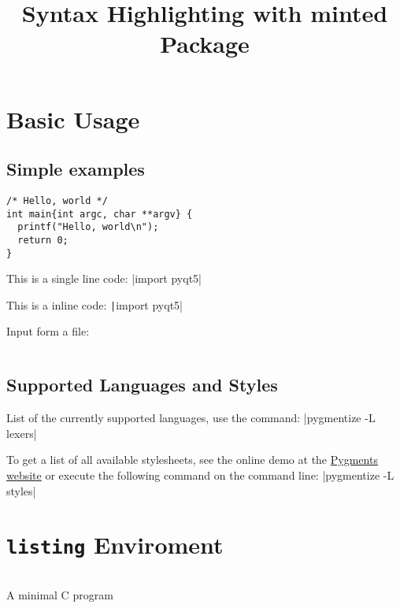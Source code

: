 \documentclass{article}
\begin{document}
\title{Syntax Highlighting with minted Package}

\maketitle

\tableofcontents

\listoflistings   %

\section{Basic Usage}

\subsection{Simple examples}

\begin{verbatim}
/* Hello, world */
int main{int argc, char **argv} {
  printf("Hello, world\n");
  return 0;
}
\end{verbatim}

This is a single line code: |import pyqt5|

This is a inline code: \texttt|import pyqt5|

Input form a file:

\inputminted[]{c}{../code/helloworld.c}

\subsection{Supported Languages and Styles}

List of the currently supported languages, use the command: |pygmentize -L lexers|

To get a list of all available stylesheets, see the online demo at the 
\href{https://pygments.org/demo/}{Pygments website} 
or execute the following command on the command line: |pygmentize -L styles|

\cprotect\section{\verb|listing| Enviroment}

\begin{listing}[H]
  \inputminted[]{c}{../code/helloworld.c}
  \caption{A minimal C program}
  \label{lst:helloworld}
\end{listing}
\end{document}
